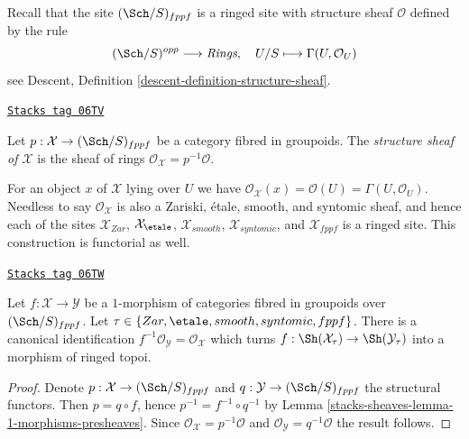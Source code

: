 \medskip\noindent
Recall that the site $(\Sch/S)_{fppf}$ is a ringed site
with structure sheaf $\mathcal{O}$ defined by the rule
$$
(\Sch/S)^{opp} \longrightarrow \textit{Rings},
\quad
U/S \longmapsto \Gamma(U, \mathcal{O}_U)
$$
see
Descent, Definition \ref{descent-definition-structure-sheaf}.

\begin{definition}
\label{stacks-sheaves-definition-structure-sheaf}
\href{https://stacks.math.columbia.edu/tag/06TV}{\texttt{Stacks tag 06TV}}

Let $p : \mathcal{X} \to (\Sch/S)_{fppf}$ be a category
fibred in groupoids. The
{\it structure sheaf of $\mathcal{X}$} is the sheaf of rings
$\mathcal{O}_\mathcal{X} = p^{-1}\mathcal{O}$.
\end{definition}

For an object $x$ of $\mathcal{X}$ lying over $U$ we have
$\mathcal{O}_\mathcal{X}(x) = \mathcal{O}(U) = \Gamma(U, \mathcal{O}_U)$.
Needless to say $\mathcal{O}_\mathcal{X}$ is also a Zariski, \'etale,
smooth, and syntomic sheaf, and hence each of the sites
$\mathcal{X}_{Zar}$, $\mathcal{X}_\etale$, $\mathcal{X}_{smooth}$,
$\mathcal{X}_{syntomic}$, and $\mathcal{X}_{fppf}$ is a ringed site.
This construction is functorial as well.

\begin{lemma}
\label{stacks-sheaves-lemma-functoriality-structure-sheaf}
\href{https://stacks.math.columbia.edu/tag/06TW}{\texttt{Stacks tag 06TW}}

Let $f : \mathcal{X} \to \mathcal{Y}$ be a $1$-morphism of categories
fibred in groupoids over $(\Sch/S)_{fppf}$. Let
$\tau \in \{Zar, \etale, smooth, syntomic, fppf\}$.
There is a canonical identification
$f^{-1}\mathcal{O}_\mathcal{Y} = \mathcal{O}_\mathcal{X}$
which turns
$f : \Sh(\mathcal{X}_\tau) \to \Sh(\mathcal{Y}_\tau)$
into a morphism of ringed topoi.
\end{lemma}

\begin{proof}
Denote $p : \mathcal{X} \to (\Sch/S)_{fppf}$ and
$q : \mathcal{Y} \to (\Sch/S)_{fppf}$ the structural functors.
Then $p = q \circ f$, hence $p^{-1} = f^{-1} \circ q^{-1}$ by
Lemma \ref{stacks-sheaves-lemma-1-morphisms-presheaves}. Since
$\mathcal{O}_\mathcal{X} = p^{-1}\mathcal{O}$ and
$\mathcal{O}_\mathcal{Y} = q^{-1}\mathcal{O}$
the result follows.
\end{proof}

